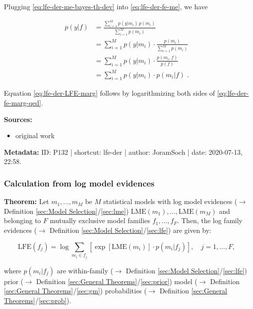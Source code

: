\documentclass[a4paper,12pt,twoside]{book}
\begin{document}
Plugging \eqref{eq:lfe-der-me-bayes-th-dev} into \eqref{eq:lfe-der-fe-me}, we have

\begin{equation} \label{eq:lfe-der-fe-marg-qed}
\begin{split}
p(y|f) &= \frac{\sum_{i=1}^M p(y|m_i) \, p(m_i)}{\sum_{i=1}^M p(m_i)} \\
&= \sum_{i=1}^M p(y|m_i) \cdot \frac{p(m_i)}{\sum_{i=1}^M p(m_i)} \\
&= \sum_{i=1}^M p(y|m_i) \cdot \frac{p(m_i,f)}{p(f)} \\
&= \sum_{i=1}^M p(y|m_i) \cdot p(m_i|f) \; .
\end{split}
\end{equation}

Equation \eqref{eq:lfe-der-LFE-marg} follows by logarithmizing both sides of \eqref{eq:lfe-der-fe-marg-qed}.


\vspace{1em}
\textbf{Sources:}
\begin{itemize}
\item original work\end{itemize}


\vspace{1em}
\textbf{Metadata:} ID: P132 | shortcut: lfe-der | author: JoramSoch | date: 2020-07-13, 22:58.
\vspace{1em}



\subsubsection[\textbf{Calculation from log model evidences}]{Calculation from log model evidences} \label{sec:lfe-lme}
\setcounter{equation}{0}

\textbf{Theorem:} Let $m_1, \ldots, m_M$ be $M$ statistical models with log model evidences ($\rightarrow$ Definition \ref{sec:Model Selection}/\ref{sec:lme}) $\mathrm{LME}(m_1), \ldots, \mathrm{LME}(m_M)$ and belonging to $F$ mutually exclusive model families $f_1, \ldots, f_F$. Then, the log family evidences ($\rightarrow$ Definition \ref{sec:Model Selection}/\ref{sec:lfe}) are given by:

\begin{equation} \label{eq:lfe-lme-LFE-LME}
\mathrm{LFE}(f_j) = \log \sum_{m_i \in f_j} \left[ \exp[\mathrm{LME}(m_i)] \cdot p(m_i|f_j) \right], \quad j = 1, \ldots, F,
\end{equation}

where $p(m_i \vert f_j)$ are within-family ($\rightarrow$ Definition \ref{sec:Model Selection}/\ref{sec:lfe}) prior ($\rightarrow$ Definition \ref{sec:General Theorems}/\ref{sec:prior}) model ($\rightarrow$ Definition \ref{sec:General Theorems}/\ref{sec:gm}) probabilities ($\rightarrow$ Definition \ref{sec:General Theorems}/\ref{sec:prob}).
\end{document}
